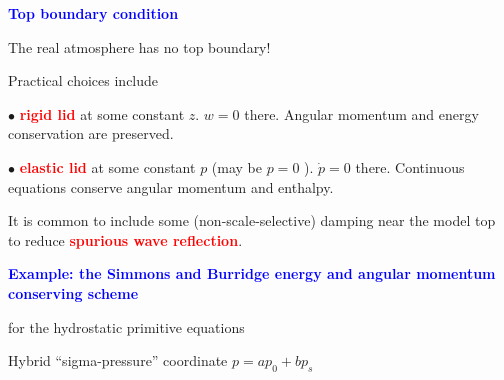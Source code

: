 \documentclass[a4]{seminar}
\newcommand{\R}[1]{\textcolor{red}{#1}}
\newcommand{\B}[1]{\textcolor{blue}{#1}}
\begin{document}

\begin{slide}

\B{\bf Top boundary condition}

\vspace{2mm}

The real atmosphere has no top boundary!

\vspace{3mm}

Practical choices include

\vspace{2mm}

\( \bullet \) \R{\bf rigid lid} at some constant \( z \). \( w = 0 \) there.
Angular momentum and energy conservation are preserved.

\vspace{3mm}

\( \bullet \) \R{\bf elastic lid} at some constant \( p \) (may be \( p = 0 \) ).
\( \dot{p} = 0 \) there. Continuous equations conserve
angular momentum and enthalpy.


\vspace{5mm}

It is common to include some (non-scale-selective) damping near the model
top to reduce \R{\bf spurious wave reflection}.




\end{slide}


\begin{slide}

\B{\bf Example: the Simmons and Burridge
energy and angular momentum conserving scheme}

for the hydrostatic primitive equations

\vspace{3mm}

Hybrid ``sigma-pressure'' coordinate \( p = a p_0 + b p_s \)

\begin{center}
\end{center}


\end{slide}

\end{document}

